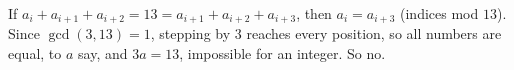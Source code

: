 If $a_i+a_{i+1}+a_{i+2}=13=a_{i+1}+a_{i+2}+a_{i+3}$, then $a_i=a_{i+3}$ (indices mod $13$). Since $\gcd(3,13)=1$, stepping by $3$ reaches every position, so all numbers are equal, to $a$ say, and $3a=13$, impossible for an integer. So $\boxed{\text{no}}$.
